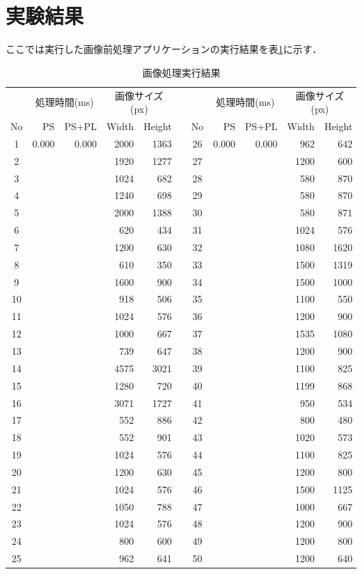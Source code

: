 \documentclass[11pt,a4j]{jreport}
\begin{document}
\section{実験結果}
ここでは実行した画像前処理アプリケーションの実行結果を表\ref{result}に示す．
\begin{table}[H]
  \caption{画像処理実行結果}
  \label{result}
  \begin{tabular}{|c|r|r|r|r|c|c|r|r|r|r|}
    \cline{1-5} \cline{7-11}
    & \multicolumn{2}{c|}{処理時間(ms)} & \multicolumn{2}{c|}{画像サイズ(px)} && & \multicolumn{2}{c|}{処理時間(ms)} & \multicolumn{2}{c|}{画像サイズ(px)} \\
    \cline{1-5} \cline{7-11}
    No & PS & PS+PL & Width & Height & & No & PS & PS+PL & Width & Height \\
    \cline{1-5} \cline{7-11}
    1 & 0.000 & 0.000 & 2000 & 1363 && 26 & 0.000 & 0.000 & 962 & 642 \\
    2 &  &  & 1920 & 1277 && 27 &  &  & 1200 & 600 \\
    3 &  &  & 1024 & 682 && 28 &  &  & 580 & 870 \\
    4 &  &  & 1240 & 698 && 29 &  &  & 580 & 870 \\
    5 &  &  & 2000 & 1388 && 30 &  &  & 580 & 871 \\
    6 &  &  & 620 & 434 && 31 &  &  & 1024 & 576 \\
    7 &  &  & 1200 & 630 && 32 &  &  & 1080 & 1620 \\
    8 &  &  & 610 & 350 && 33 &  &  & 1500 & 1319 \\
    9 &  &  & 1600 & 900 && 34 &  &  & 1500 & 1000 \\
    10 &  &  & 918 & 506 && 35 &  &  & 1100 & 550 \\
    11 &  &  & 1024 & 576 && 36 &  &  & 1200 & 900 \\
    12 &  &  & 1000 & 667 && 37 &  &  & 1535 & 1080 \\
    13 &  &  & 739 & 647 && 38 &  &  & 1200 & 900 \\
    14 &  &  & 4575 & 3021 && 39 &  &  & 1100 & 825 \\
    15 &  &  & 1280 & 720 && 40 &  &  & 1199 & 868 \\
    16 &  &  & 3071 & 1727 && 41 &  &  & 950 & 534 \\
    17 &  &  & 552 & 886 && 42 &  &  & 800 & 480 \\
    18 &  &  & 552 & 901 && 43 &  &  & 1020 & 573 \\
    19 &  &  & 1024 & 576 && 44 &  &  & 1100 & 825 \\
    20 &  &  & 1200 & 630 && 45 &  &  & 1200 & 800 \\
    21 &  &  & 1024 & 576 && 46 &  &  & 1500 & 1125 \\
    22 &  &  & 1050 & 788 && 47 &  &  & 1000 & 667 \\
    23 &  &  & 1024 & 576 && 48 &  &  & 1200 & 900 \\
    24 &  &  & 800 & 600 && 49 &  &  & 1200 & 800 \\
    25 &  &  & 962 & 641 && 50 &  &  & 1200 & 640 \\
    \cline{1-5} \cline{7-11}
    \end{tabular}
\end{table}
\end{document}
